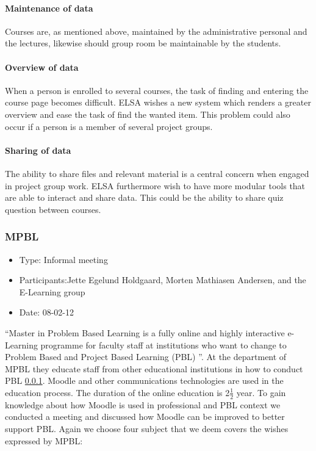 \paragraph{Maintenance of data} Courses are, as mentioned above, maintained by the administrative personal and the lectures, likewise should group room be maintainable by the students. 
\paragraph{Overview of data} When a person is enrolled to several courses, the task of finding and entering the course page becomes difficult. 
ELSA wishes a new system which renders a greater overview and ease the task of find the wanted item. 
This problem could also occur if a person is a member of several project groups.
\paragraph{Sharing of data} The ability to share files and relevant material is a central concern when engaged in project group work. ELSA furthermore wish to have more modular tools that are able to interact and share data.
This could be the ability to share quiz question between courses. 


\subsubsection{MPBL}
\begin{itemize}
	\item Type: Informal meeting
	\item Participants:Jette Egelund Holdgaard, Morten Mathiasen Andersen, and the E-Learning group
	\item Date: 08-02-12
\end{itemize}
``Master in Problem Based Learning is a fully online and highly interactive e-Learning programme for faculty staff at institutions who want to change to Problem Based and Project Based Learning (PBL) ''\cite{mpbl}.
At the department of MPBL they educate staff from other educational institutions in how to conduct PBL \ref{}. Moodle and other communications technologies are used in the education process. 
The duration of the online education is 2$\frac{1}{2}$ year.
To gain knowledge about how Moodle is used in professional and PBL context we conducted a meeting and discussed how Moodle can be improved to better support PBL. Again we choose four subject that we deem covers the wishes expressed by MPBL:

